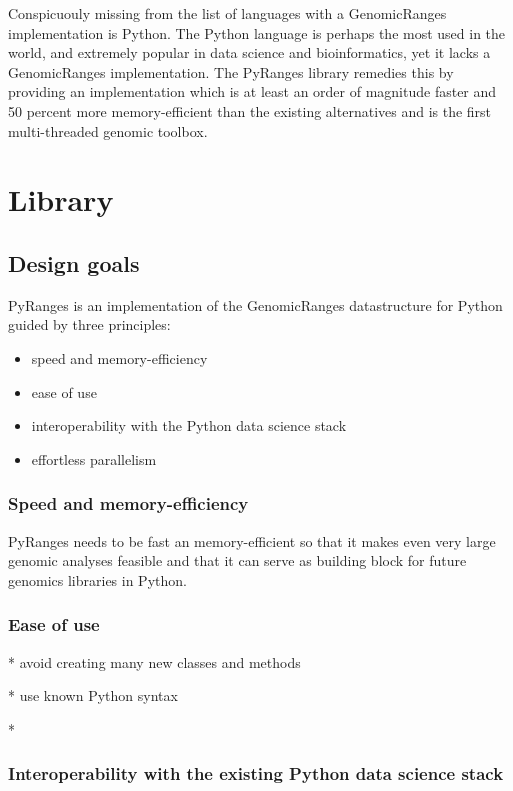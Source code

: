 \documentclass[10pt,letterpaper]{article}
\begin{document}
Conspicuouly missing from the list of languages with a GenomicRanges
implementation is Python. The Python language is perhaps the most used in the
world\footnotemark, and extremely popular in data science and bioinformatics,
yet it lacks a GenomicRanges implementation. The PyRanges library remedies this
by providing an implementation which is at least an order of magnitude faster
and 50 percent more memory-efficient than the existing alternatives and is the
first multi-threaded genomic toolbox.


\section*{Library}

\subsection*{Design goals}

PyRanges is an implementation of the GenomicRanges datastructure for Python
guided by three principles:

\begin{itemize}
  \item speed and memory-efficiency
  \item ease of use
  \item interoperability with the Python data science stack
  \item effortless parallelism
\end{itemize}


\subsubsection*{Speed and memory-efficiency}

PyRanges needs to be fast an memory-efficient so that it makes even very large
genomic analyses feasible and that it can serve as building block for future
genomics libraries in Python.

\subsubsection*{Ease of use}

* avoid creating many new classes and methods

* use known Python syntax

*

\subsubsection*{Interoperability with the existing Python data science stack}
\end{document}
